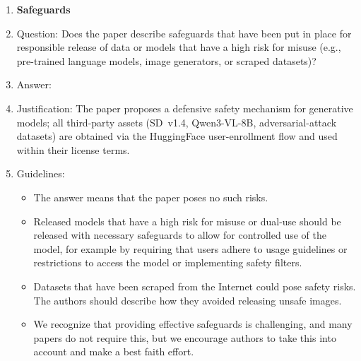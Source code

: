 \begin{enumerate}
\item {\bf Safeguards}
    \item[] Question: Does the paper describe safeguards that have been put in place for responsible release of data or models that have a high risk for misuse (e.g., pre-trained language models, image generators, or scraped datasets)?
    \item[] Answer: \answerYes{}
    \item[] Justification: The paper proposes a defensive safety mechanism for generative models; all third-party assets (SD~v1.4, Qwen3-VL-8B, adversarial-attack datasets) are obtained via the HuggingFace user-enrollment flow and used within their license terms.
    \item[] Guidelines:
    \begin{itemize}
        \item The answer \answerNA{} means that the paper poses no such risks.
        \item Released models that have a high risk for misuse or dual-use should be released with necessary safeguards to allow for controlled use of the model, for example by requiring that users adhere to usage guidelines or restrictions to access the model or implementing safety filters.
        \item Datasets that have been scraped from the Internet could pose safety risks. The authors should describe how they avoided releasing unsafe images.
        \item We recognize that providing effective safeguards is challenging, and many papers do not require this, but we encourage authors to take this into account and make a best faith effort.
    \end{itemize}


\end{enumerate}
